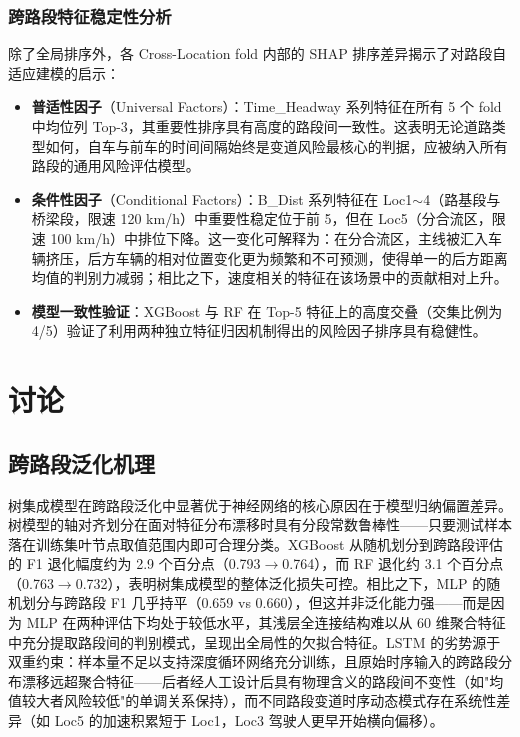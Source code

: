 \documentclass[preprint,review,12pt,a4paper]{elsarticle}
\begin{document}
\subsubsection{跨路段特征稳定性分析}

除了全局排序外，各 Cross-Location fold 内部的 SHAP 排序差异揭示了对路段自适应建模的启示：

\begin{itemize}
  \item \textbf{普适性因子}（Universal Factors）：Time\_Headway 系列特征在所有 5 个 fold 中均位列 Top-3，其重要性排序具有高度的路段间一致性。这表明无论道路类型如何，自车与前车的时间间隔始终是变道风险最核心的判据，应被纳入所有路段的通用风险评估模型。

  \item \textbf{条件性因子}（Conditional Factors）：B\_Dist 系列特征在 Loc1$\sim$4（路基段与桥梁段，限速 120 km/h）中重要性稳定位于前 5，但在 Loc5（分合流区，限速 100 km/h）中排位下降。这一变化可解释为：在分合流区，主线被汇入车辆挤压，后方车辆的相对位置变化更为频繁和不可预测，使得单一的后方距离均值的判别力减弱；相比之下，速度相关的特征在该场景中的贡献相对上升。

  \item \textbf{模型一致性验证}：XGBoost 与 RF 在 Top-5 特征上的高度交叠（交集比例为 4/5）验证了利用两种独立特征归因机制得出的风险因子排序具有稳健性。
\end{itemize}

\section{讨论}

\subsection{跨路段泛化机理}

树集成模型在跨路段泛化中显著优于神经网络的核心原因在于模型归纳偏置差异。树模型的轴对齐划分在面对特征分布漂移时具有分段常数鲁棒性——只要测试样本落在训练集叶节点取值范围内即可合理分类。XGBoost 从随机划分到跨路段评估的 F1 退化幅度约为 2.9 个百分点（0.793$\to$0.764），而 RF 退化约 3.1 个百分点（0.763$\to$0.732），表明树集成模型的整体泛化损失可控。相比之下，MLP 的随机划分与跨路段 F1 几乎持平（0.659 vs 0.660），但这并非泛化能力强——而是因为 MLP 在两种评估下均处于较低水平，其浅层全连接结构难以从 60 维聚合特征中充分提取路段间的判别模式，呈现出全局性的欠拟合特征。LSTM 的劣势源于双重约束：样本量不足以支持深度循环网络充分训练，且原始时序输入的跨路段分布漂移远超聚合特征——后者经人工设计后具有物理含义的路段间不变性（如"均值较大者风险较低"的单调关系保持），而不同路段变道时序动态模式存在系统性差异（如 Loc5 的加速积累短于 Loc1，Loc3 驾驶人更早开始横向偏移）。
\end{document}
